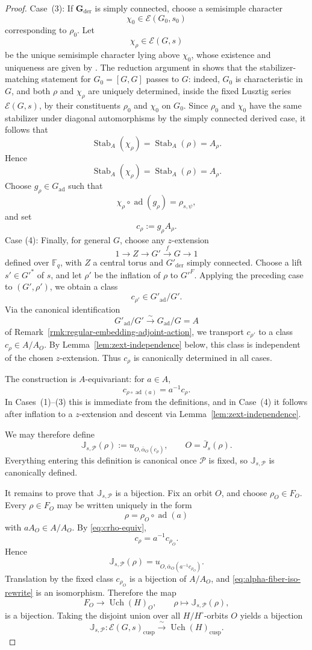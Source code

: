 \documentclass{amsart}
\theoremstyle{plain}
\numberwithin{equation}{section}
\theoremstyle{definition}
\newcommand{\cP}{\mathcal{P}}
\newcommand{\cE}{\mathcal{E}}
\newcommand{\Uch}{\operatorname{Uch}}
\newcommand{\J}{\mathbb{J}}
\newcommand{\Stab}{\operatorname{Stab}}
\newcommand{\ad}{\operatorname{ad}}
\newcommand{\der}{\operatorname{der}}
\newcommand{\cusp}{\operatorname{cusp}}
\newcommand{\bG}{\mathbf{G}}
\newcommand{\F}{\mathbb{F}}
\begin{document}
\begin{proof}
Case~(3): If \(\bG_{\der}\) is simply connected, choose a semisimple character
\[
\chi_0\in \cE(G_0,s_0)
\]
corresponding to \(\rho_0\). Let
\[
\chi_\rho\in \cE(G,s)
\]
be the unique semisimple character lying above \(\chi_0\), whose existence and
uniqueness are given by \cite[Lem.~4.1(b)]{Malle2017}.  The reduction argument in
\cite[proof of Thm.~1, immediately after Lem.~4.1]{Malle2017} shows that the
stabilizer-matching statement for \(G_0=[G,G]\) passes to \(G\): indeed,
\(G_0\) is characteristic in \(G\), and both \(\rho\) and \(\chi_\rho\) are uniquely
determined, inside the fixed Lusztig series \(\cE(G,s)\), by their constituents
\(\rho_0\) and \(\chi_0\) on \(G_0\).  Since \(\rho_0\) and \(\chi_0\) have the same
stabilizer under diagonal automorphisms by the simply connected derived case, it
follows that
\[
\Stab_A(\chi_\rho)=\Stab_A(\rho)=A_\rho .
\]
Hence
\[
\Stab_A(\chi_\rho)=\Stab_A(\rho)=A_\rho.
\]
Choose \(g_\rho\in G_{\ad}\) such that
\[
\chi_\rho\circ \ad(g_\rho)=\rho_{s,\psi},
\]
and set
\[
c_\rho:=g_\rho A_\rho.
\]
Case (4): Finally, for general \(G\), choose any \(z\)-extension
\[
1\longrightarrow Z\longrightarrow G'\xrightarrow{\,f\,} G\longrightarrow 1
\]
defined over \(\F_q\), with \(Z\) a central torus and \(G'_{\der}\) simply connected. Choose a lift
\(s'\in G'^*\) of \(s\), and let \(\rho'\) be the inflation of \(\rho\) to \(G'^F\). Applying the
preceding case to \((G',\rho')\), we obtain a class
\[
c_{\rho'}\in G'_{\ad}/G'.
\]
Via the canonical identification
\[
G'_{\ad}/G'\xrightarrow{\sim} G_{\ad}/G=A
\]
of Remark~\ref{rmk:regular-embedding-adjoint-action}, we transport \(c_{\rho'}\) to a class \(c_\rho\in A/A_O\).
By Lemma~\ref{lem:zext-independence} below, this class is independent of the chosen \(z\)-extension.
Thus \(c_\rho\) is canonically determined in all cases.

The construction is \(A\)-equivariant: for \(a\in A\),
\begin{equation}\label{eq:crho-equiv}
c_{\rho\circ \ad(a)}=a^{-1}c_\rho.
\end{equation}
In Cases~(1)--(3) this is immediate from the definitions, and in Case~(4) it
follows after inflation to a \(z\)-extension and descent via Lemma~\ref{lem:zext-independence}.

We may therefore define
\[
\J_{s,\cP}(\rho):=u_{O,\bar\alpha_O(c_\rho)},
\qquad O=\bar J_s(\rho).
\]
Everything entering this definition is canonical once \(\cP\) is fixed, so
\(\J_{s,\cP}\) is canonically defined.

It remains to prove that \(\J_{s,\cP}\) is a bijection. Fix an orbit \(O\), and choose
\(\rho_O\in F_O\). Every \(\rho\in F_O\) may be written uniquely in the form
\[
\rho=\rho_O\circ \ad(a)
\]
with \(aA_O\in A/A_O\). By \eqref{eq:crho-equiv},
\[
c_\rho=a^{-1}c_{\rho_O}.
\]
Hence
\[
\J_{s,\cP}(\rho)=u_{O,\bar\alpha_O(a^{-1}c_{\rho_O})}.
\]
Translation by the fixed class \(c_{\rho_O}\) is a bijection of \(A/A_O\), and
\eqref{eq:alpha-fiber-iso-rewrite} is an isomorphism. Therefore the map
\[
F_O\longrightarrow \Uch(H)_O,\qquad
\rho\longmapsto \J_{s,\cP}(\rho),
\]
is a bijection. Taking the disjoint union over all \(H/H^\circ\)-orbits \(O\) yields a bijection
\[
\J_{s,\cP}:\cE(G,s)_{\cusp}\xrightarrow{\ \sim\ }\Uch(H)_{\cusp}.
\]


\end{proof}
\end{document}
